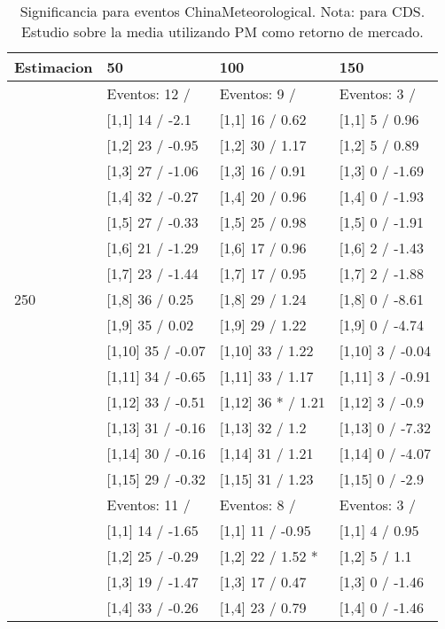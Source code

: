 \begin{table}

\caption{Significancia para eventos ChinaMeteorological. Nota: para CDS. Estudio sobre la media utilizando PM como retorno de mercado.}
\centering
\begin{tabular}[t]{llll}
\toprule
Estimacion & 50 & 100 & 150\\
\midrule
 & Eventos:  12 / & Eventos:  9 / & Eventos:  3 /\\
 & {}[1,1] 14  / -2.1 & {}[1,1] 16  / 0.62 & {}[1,1] 5  / 0.96\\
 & {}[1,2] 23  / -0.95 & {}[1,2] 30  / 1.17 & {}[1,2] 5  / 0.89\\
 & {}[1,3] 27  / -1.06 & {}[1,3] 16  / 0.91 & {}[1,3] 0  / -1.69\\
 & {}[1,4] 32  / -0.27 & {}[1,4] 20  / 0.96 & {}[1,4] 0  / -1.93\\
\addlinespace
 & {}[1,5] 27  / -0.33 & {}[1,5] 25  / 0.98 & {}[1,5] 0  / -1.91\\
 & {}[1,6] 21  / -1.29 & {}[1,6] 17  / 0.96 & {}[1,6] 2  / -1.43\\
 & {}[1,7] 23  / -1.44 & {}[1,7] 17  / 0.95 & {}[1,7] 2  / -1.88\\
250 & {}[1,8] 36  / 0.25 & {}[1,8] 29  / 1.24 & {}[1,8] 0  / -8.61\\
 & {}[1,9] 35  / 0.02 & {}[1,9] 29  / 1.22 & {}[1,9] 0  / -4.74\\
\addlinespace
 & {}[1,10] 35  / -0.07 & {}[1,10] 33  / 1.22 & {}[1,10] 3  / -0.04\\
 & {}[1,11] 34  / -0.65 & {}[1,11] 33  / 1.17 & {}[1,11] 3  / -0.91\\
 & {}[1,12] 33  / -0.51 & {}[1,12] 36 * / 1.21 & {}[1,12] 3  / -0.9\\
 & {}[1,13] 31  / -0.16 & {}[1,13] 32  / 1.2 & {}[1,13] 0  / -7.32\\
 & {}[1,14] 30  / -0.16 & {}[1,14] 31  / 1.21 & {}[1,14] 0  / -4.07\\
\addlinespace
 & {}[1,15] 29  / -0.32 & {}[1,15] 31  / 1.23 & {}[1,15] 0  / -2.9\\
 & Eventos:  11 / & Eventos:  8 / & Eventos:  3 /\\
 & {}[1,1] 14  / -1.65 & {}[1,1] 11  / -0.95 & {}[1,1] 4  / 0.95\\
 & {}[1,2] 25  / -0.29 & {}[1,2] 22  / 1.52 * & {}[1,2] 5  / 1.1\\
 & {}[1,3] 19  / -1.47 & {}[1,3] 17  / 0.47 & {}[1,3] 0  / -1.46\\
\addlinespace
 & {}[1,4] 33  / -0.26 & {}[1,4] 23  / 0.79 & {}[1,4] 0  / -1.46\\

\end{tabular}
\end{table}
